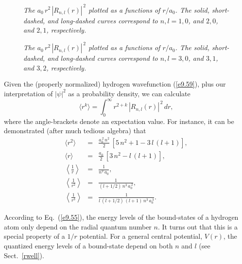 \begin{figure}
\epsfysize=3in
\centerline{}
\caption{\em The $a_0\,r^2\,|R_{n,l}(r)|^{\,2}$ plotted as a functions of $r/a_0$. The solid, short-dashed, and long-dashed curves correspond to 
$n,l=1,0$,  and $2,0$, and $2,1$, respectively.}\label{coul1}   
\end{figure}

\begin{figure}
\epsfysize=3in
\centerline{}
\caption{\em The $a_0\,r^2\,|R_{n,l}(r)|^{\,2}$ plotted as a functions of $r/a_0$. The solid, short-dashed, and long-dashed curves correspond to 
$n,l=3,0$,  and $3,1$, and $3,2$, respectively.}\label{coul2}   
\end{figure}

Given the (properly normalized) hydrogen wavefunction (\ref{e9.59}),
plus our interpretation of $|\psi|^2$ as a probability density,  we can calculate
\begin{equation}
\langle r^k\rangle = \int_0^\infty r^{2+k}\,|R_{n,l}(r)|^{\,2}\,dr,
\end{equation}
where the angle-brackets denote an expectation value.
For instance, it can be demonstrated (after much tedious algebra) that
\begin{eqnarray}
\langle r^2\rangle &=& \frac{a_0^{\,2}\,n^2}{2}\,[5\,n^2+1-3\,l\,(l+1)],\label{e9.73}\\[0.5ex]
\langle r\rangle &=& \frac{a_0}{2}\,[3\,n^2-l\,(l+1)],\\[0.5ex]
\left\langle \frac{1}{r}\right\rangle &=& \frac{1}{n^2\,a_0},\label{e9.74}\\[0.5ex]
\left\langle\frac{1}{r^2}\right\rangle &=& \frac{1}{(l+1/2)\,n^3\,a_0^{\,2}},\label{e9.75}\\[0.5ex]
\left\langle\frac{1}{r^3}\right\rangle &=&\frac{1}{l\,(l+1/2)\,(l+1)\,n^3\,a_0^{\,3}}.\label{e9.75a}
\end{eqnarray}

According to Eq.~(\ref{e9.55}), the energy levels of the bound-states of a hydrogen atom
only depend on the radial quantum number $n$. It turns out that this is a special
property of a $1/r$ potential. For a general central potential, $V(r)$, the
quantized energy levels of a bound-state depend on both $n$ and $l$ (see Sect.~\ref{rwell}).

